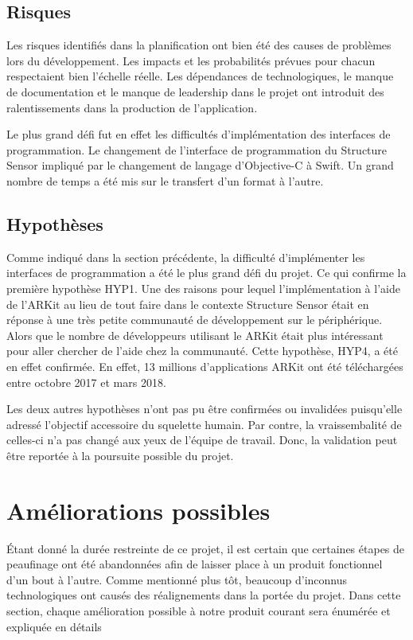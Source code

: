 \documentclass[rapport.tex]{subfiles}
\begin{document}
\subsection*{Risques}
Les risques identifiés dans la planification ont bien été des causes de problèmes lors du développement. Les impacts et les probabilités prévues pour chacun respectaient bien l’échelle réelle. Les dépendances de technologiques, le manque de documentation et le manque de leadership dans le projet ont introduit des ralentissements dans la production de l’application.
\par
Le plus grand défi fut en effet les difficultés d’implémentation des interfaces de programmation. Le changement de l’interface de programmation du Structure Sensor impliqué par le changement de langage d’Objective-C à Swift. Un grand nombre de temps a été mis sur le transfert d’un format à l’autre.
\subsection*{Hypothèses}
Comme indiqué dans la section précédente, la difficulté d’implémenter les interfaces de programmation a été le plus grand défi du projet. Ce qui confirme la première hypothèse HYP1. Une des raisons pour lequel l’implémentation à l’aide de l’ARKit au lieu de tout faire dans le contexte Structure Sensor était en réponse à une très petite communauté de développement sur le périphérique. Alors que le nombre de développeurs utilisant le ARKit était plus intéressant pour aller chercher de l’aide chez la communauté. Cette hypothèse, HYP4, a été en effet confirmée. En effet, 13 millions d'applications ARKit ont été téléchargées entre octobre 2017 et mars 2018. \citep*{remi}
\par
Les deux autres hypothèses n’ont pas pu être confirmées ou invalidées puisqu’elle adressé l’objectif accessoire du squelette humain. Par contre, la vraissembalité de celles-ci n’a pas changé aux yeux de l’équipe de travail. Donc, la validation peut être reportée à la poursuite possible du projet.
\section*{Améliorations possibles}
Étant donné la durée restreinte de ce projet, il est certain que certaines étapes de peaufinage ont été abandonnées afin de laisser place à un produit fonctionnel d’un bout à l’autre. Comme mentionné plus tôt, beaucoup d’inconnus technologiques ont causés des réalignements dans la portée du projet. Dans cette section, chaque amélioration possible à notre produit courant sera énumérée et expliquée en détails
\end{document}

